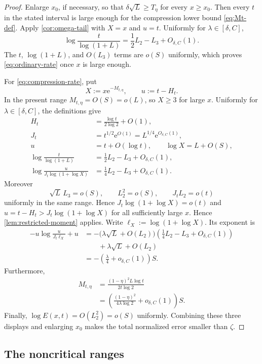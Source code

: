 \documentclass[11pt]{amsart}
\theoremstyle{definition}
\theoremstyle{remark}
\numberwithin{equation}{section}
\newcommand{\e}{\mathrm e}
\begin{document}
\begin{proof}
Enlarge $x_0$, if necessary, so that $\delta\sqrt L\ge T_\eta$ for every $x\ge x_0$.  Then every $t$ in the stated interval is large enough for the compression lower bound \eqref{eq:Mt-def}.
Apply \cref{cor:omega-tail} with $X=x$ and $u=t$.  Uniformly for $\lambda\in[\delta,C]$,
\[
 \log\frac{t}{\log(1+L)}
 =\frac12L_2-L_3+O_{\delta,C}(1).
\]
The $t$, $\log(1+L)$, and $O(L_3)$ terms are $o(S)$ uniformly, which proves \eqref{eq:ordinary-rate} once $x$ is large enough.

For \eqref{eq:compression-rate}, put
\[
 X:=x\e^{-M_{t,\eta}},
 \qquad
 u:=t-H_t.
\]
In the present range $M_{t,\eta}=O(S)=o(L)$, so $X\ge3$ for large $x$.  Uniformly for $\lambda\in[\delta,C]$, the definitions give
\[
\begin{aligned}
 H_t&=\frac{\log t}{2\log 2}+O(1),\\
 J_t&=t^{1/2}\e^{O(1)}=L^{1/4}\e^{O_{\delta,C}(1)},\\
 u&=t+O(\log t),\qquad \log X=L+O(S),\\
 \log\frac{t}{\log(1+L)}
 &=\frac12L_2-L_3+O_{\delta,C}(1),\\
 \log\frac{u}{J_t\log(1+\log X)}
 &=\frac14L_2-L_3+O_{\delta,C}(1).
\end{aligned}
\]
Moreover
\[
 \sqrt L\,L_3=o(S),\qquad L_2^2=o(S),\qquad J_t L_2=o(t)
\]
uniformly in the same range.  Hence $J_t\log(1+\log X)=o(t)$ and $u=t-H_t>J_t\log(1+\log X)$ for all sufficiently large $x$.  Hence \cref{lem:restricted-moment} applies.  Write
$\ell_X:=\log(1+\log X)$.  Its exponent is
\begin{align*}
 -u\log\frac{u}{J_t\ell_X}+u
 &=-\bigl(\lambda\sqrt L+O(L_2)\bigr)
 \left(\frac14L_2-L_3+O_{\delta,C}(1)\right)\\
 &\qquad+\lambda\sqrt L+O(L_2)\\
 &=-\left(\frac\lambda4+o_{\delta,C}(1)\right)S.
\end{align*}
Furthermore,
\begin{align*}
 M_{t,\eta}
 &=\frac{(1-\eta)^2L\log t}{2t\log 2}\\
 &=\left(\frac{(1-\eta)^2}{4\lambda\log 2}
 +o_{\delta,C}(1)\right)S.
\end{align*}
Finally, $\log E(x,t)=O(L_2^2)=o(S)$ uniformly.  Combining these three
displays and enlarging $x_0$ makes the total normalized error smaller
than $\zeta$.
\end{proof}

\subsection{The noncritical ranges}
\end{document}
